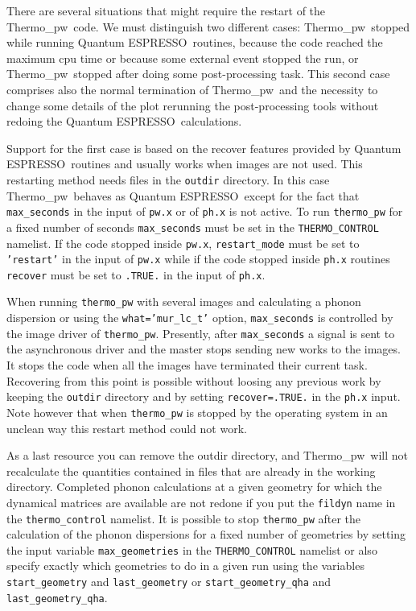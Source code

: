 \documentclass[12pt,a4paper,twoside]{report}
\def\qe{{\sc Quantum ESPRESSO}}
\def\thermo{{\sc Thermo\_pw}}
\begin{document}
There are several situations that might require the restart of the \thermo\ 
code. We must distinguish two different cases:
\thermo\ stopped while running \qe\ routines, because the code reached
the maximum cpu time or because some external event stopped the run,
or \thermo\ stopped after doing some post-processing task. This second 
case comprises also the normal termination of
\thermo\ and the necessity to change some details of the plot rerunning
the post-processing tools without redoing the \qe\ calculations.

Support for the first case is based on the recover features provided by 
\qe\ routines and usually works when images are not used. This restarting 
method needs files in the \texttt{outdir}
directory. In this case \thermo\ behaves as \qe\ 
except for the fact that \texttt{max\_seconds} in the input of \texttt{pw.x} or
of \texttt{ph.x} is not active. To run \texttt{thermo\_pw}
for a fixed number of seconds \texttt{max\_seconds} must be set in the
\texttt{THERMO\_CONTROL} namelist. If the code stopped inside \texttt{pw.x},
\texttt{restart\_mode} must be set to \texttt{'restart'} in the input of 
\texttt{pw.x} while if the code stopped inside \texttt{ph.x} routines
\texttt{recover} must be set to \texttt{.TRUE.} in the input of \texttt{ph.x}.

When running \texttt{thermo\_pw} with several images and
calculating a phonon dispersion or using the \texttt{what='mur\_lc\_t'}
option, \texttt{max\_seconds} is controlled by the image driver of 
\texttt{thermo\_pw}. Presently, after \texttt{max\_seconds} a signal
is sent to the asynchronous driver and the master stops sending new works 
to the images. It stops the code when all the images have terminated their
current task. Recovering from this point is possible without loosing 
any previous work by keeping the \texttt{outdir} directory and by setting 
\texttt{recover=.TRUE.} in the \texttt{ph.x} input.
Note however that when \texttt{thermo\_pw} is stopped by the operating 
system in an unclean way this restart method could not work.

As a last resource you can remove the outdir directory, and \thermo\ 
will not recalculate the quantities contained in files that are already 
in the working directory. Completed phonon calculations at a given
geometry for which the dynamical matrices are available are
not redone if you put the \texttt{fildyn} name in the 
\texttt{thermo\_control} namelist. It is possible to stop 
\texttt{thermo\_pw} after the 
calculation of the phonon dispersions for a fixed number of geometries 
by setting the input variable \texttt{max\_geometries} in the 
\texttt{THERMO\_CONTROL} namelist or also specify exactly which geometries
to do in a given run using the variables \texttt{start\_geometry} and
\texttt{last\_geometry} or \texttt{start\_geometry\_qha} and 
\texttt{last\_geometry\_qha}. 
\end{document}
